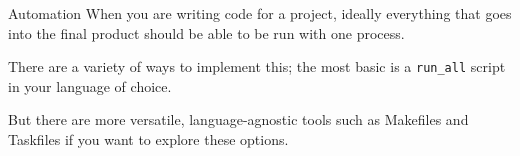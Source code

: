 \begin{frame}{Automation}
    \stretchon
    When you are writing code for a project, ideally everything that goes into
    the final product should be able to be run with one process.

    There are a variety of ways to implement this; the most basic is
    a \texttt{run\_all} script in your language of choice.

    But there are more versatile, language-agnostic tools such as Makefiles and
    Taskfiles if you want to explore these options.
\end{frame}
